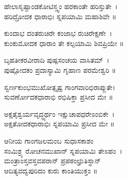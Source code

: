 ಹೇಲಾಸೃಷ್ಟಾಂಡಕೋಟಿಸ್ತ್ವಂ ಹರಕಾಂತೇ ಹರಿಸ್ತುತೇ~।\\ ಹರಿದ್ರೋದಕ ಧಾರಾಭಿಃ ಸ್ನಪಯಾಮಿ ಮಹಾಶಿವೇ ॥\\

ಕುಂದಾಭ ದಂತರುಚಿರೇ ಕಂಜಾಭ ರುಚಿರೇಕ್ಷಣೇ~।\\ಕುಂಕುಮೋದಕ ಧಾರಾಂ ತೇ ಕಲ್ಪಯಾಮಿ ಶಿವಪ್ರಿಯೇ ॥

ಬೃಹತೀಕರವೀರಾದಿ ಪುಷ್ಪಸಂಚಯ ವಾಸಿತಮ್~।\\ಪುಷ್ಪೋದಕಂ ಪ್ರದಾಸ್ಯಾಮಿ ಗೃಹಾಣ ಪರಮೇಶ್ವರಿ ॥

ಸ್ವರ್ಣಕುಂಭಮುಖೋತ್ಸೃಷ್ಟ ಗಾಂಗವಾರಿಭಿರಾಪ್ಲುತೇ।\\ ಸುವರ್ಣೋದಕಧಾರಾಭಿ ರಭಿಷಿಕ್ತಾ ಪ್ರಸೀದ ಮೇ ॥

ಅಕ್ಷತೈಶ್ವರ್ಯವೃದ್ಧ್ಯರ್ಥಂ ಇಕ್ಷುಚಾಪಧರೇಽಂಬಿಕೇ~।\\ಅಕ್ಷತೋದಕಧಾರಾಭಿಃ ಸ್ನಪಯಾಮಿ ಪ್ರಸೀದ ಮೇ ॥

ಆನೀಯ ಗಾಂಗಜಲಮಂಬ ಸುಧಾಸಕಾಶಂ \\ಸಂಮಿಶ್ರ್ಯ ರೋಚನಮುಖಾನ್ ಸ್ನಪಯಾಮಿ ತೇಽಹಂ~।\\
ಮಂತ್ರಾಂಸ್ತವಸ್ತವಪರಾನ್ ಪ್ರಪಠಂಛ್ರುತಿಸ್ಥಾನ್ \\ಆದಿತ್ಯವದ್ವಪುರಿದಂ ಕುರು ಕಾಂತಿಯುಕ್ತಂ ॥
